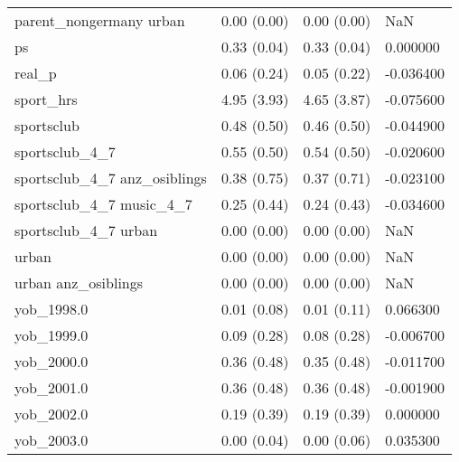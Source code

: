 \begin{tabular}{llll}
parent\_nongermany urban & 0.00 (0.00) & 0.00 (0.00) & NaN \\
ps & 0.33 (0.04) & 0.33 (0.04) & 0.000000 \\
real\_p & 0.06 (0.24) & 0.05 (0.22) & -0.036400 \\
sport\_hrs & 4.95 (3.93) & 4.65 (3.87) & -0.075600 \\
sportsclub & 0.48 (0.50) & 0.46 (0.50) & -0.044900 \\
sportsclub\_4\_7 & 0.55 (0.50) & 0.54 (0.50) & -0.020600 \\
sportsclub\_4\_7 anz\_osiblings & 0.38 (0.75) & 0.37 (0.71) & -0.023100 \\
sportsclub\_4\_7 music\_4\_7 & 0.25 (0.44) & 0.24 (0.43) & -0.034600 \\
sportsclub\_4\_7 urban & 0.00 (0.00) & 0.00 (0.00) & NaN \\
urban & 0.00 (0.00) & 0.00 (0.00) & NaN \\
urban anz\_osiblings & 0.00 (0.00) & 0.00 (0.00) & NaN \\
yob\_1998.0 & 0.01 (0.08) & 0.01 (0.11) & 0.066300 \\
yob\_1999.0 & 0.09 (0.28) & 0.08 (0.28) & -0.006700 \\
yob\_2000.0 & 0.36 (0.48) & 0.35 (0.48) & -0.011700 \\
yob\_2001.0 & 0.36 (0.48) & 0.36 (0.48) & -0.001900 \\
yob\_2002.0 & 0.19 (0.39) & 0.19 (0.39) & 0.000000 \\
yob\_2003.0 & 0.00 (0.04) & 0.00 (0.06) & 0.035300 \\
\bottomrule
\end{tabular}
